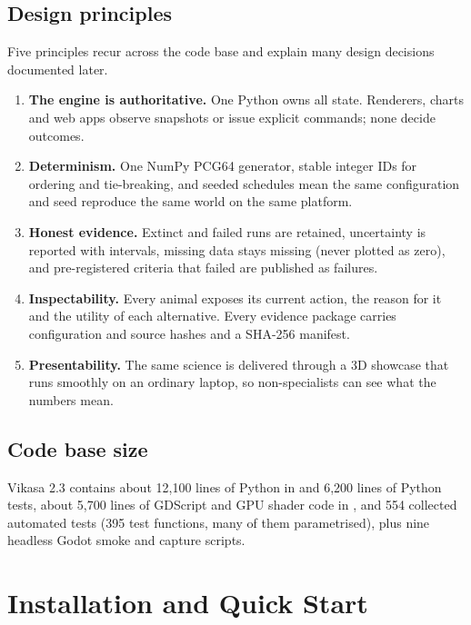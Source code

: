 \section{Design principles}
Five principles recur across the code base and explain many design decisions
documented later.
\begin{enumerate}[leftmargin=*]
\item \textbf{The engine is authoritative.} One Python 
owns all state. Renderers, charts and web apps observe snapshots or issue explicit
commands; none decide outcomes.
\item \textbf{Determinism.} One NumPy PCG64 generator, stable integer IDs for
ordering and tie-breaking, and seeded schedules mean the same configuration and
seed reproduce the same world on the same platform.
\item \textbf{Honest evidence.} Extinct and failed runs are retained, uncertainty
is reported with intervals, missing data stays missing (never plotted as zero),
and pre-registered criteria that failed are published as failures.
\item \textbf{Inspectability.} Every animal exposes its current action, the
reason for it and the utility of each alternative. Every evidence package carries
configuration and source hashes and a SHA-256 manifest.
\item \textbf{Presentability.} The same science is delivered through a 3D
showcase that runs smoothly on an ordinary laptop, so non-specialists can see
what the numbers mean.
\end{enumerate}

\section{Code base size}
Vikasa 2.3 contains about 12{,}100 lines of Python in  and 6{,}200 lines
of Python tests, about 5{,}700 lines of GDScript and GPU shader code in
, and 554 collected automated tests (395 test functions, many of them
parametrised), plus nine headless Godot smoke and capture scripts.

\chapter{Installation and Quick Start}

